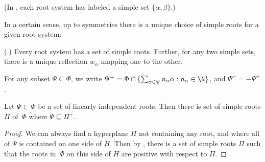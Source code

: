 \documentclass[11pt]{article}
\newcommand{\hgt}{{\mathrm{ht}}}
\begin{document}
\noindent (In , each root system has labeled a simple set $\{\alpha,\beta\}$.)

In a certain sense, up to symmetries there is a unique choice of simple roots for a given root system:
\begin{fact} (\cite[Prop.~2.1.2, Cor~2.2.5]{Car89}.)
    Every root system has a set of simple roots.
    Further, for any two simple sets, there is a unique reflection $w_\alpha$ mapping one to the other.
%
\end{fact}

\begin{definition}
For any subset $\Psi \subseteq \Phi$, we write $\Psi^+ = \Phi \cap \{\sum_{\alpha \in \Psi} n_\alpha \alpha : n_\alpha \in \N\}$, and $\Psi^{-} = -\Psi^+$.
\end{definition}

\begin{fact}\label{fact:simplechoice}
Let $\Psi \subset \Phi$ be a set of linearly independent roots. Then there is set of simple roots $\Pi$ of~$\Phi$ where $\Psi \subseteq \Pi^+$.
\end{fact}
\begin{proof}
We can always find a hyperplane $H$ not containing any root, and where all of $\Psi$ is contained on one side of $H$. Then by \cite[Thm.~8.16]{Hal03}, there is a set of simple roots $\Pi$ such that the roots in~$\Phi$ on this side of $H$ are positive with respect to $\Pi$.
\end{proof}
\end{document}
